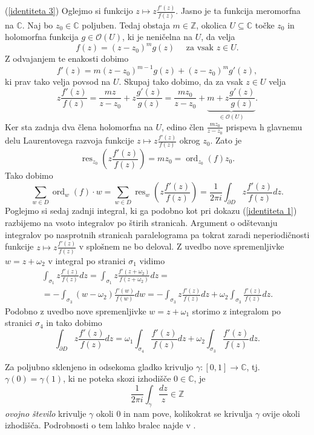 \documentclass[mat1]{fmfdelo}
\numberwithin{equation}{section}
\newcommand{\Z}{\mathbb Z}
\newcommand{\C}{\mathbb C}
\newcommand{\res}[2]{\operatorname{res}_{#1}(#2)}
\newcommand{\ord}[2]{\operatorname{ord}_{#1}(#2)}
\newcommand{\hol}[1]{\mathcal{O}(#1)}
\theoremstyle{definition}
\begin{document}
\begin{dokaz}
    (\ref{identiteta 3}) Oglejmo si funkcijo $z \mapsto z \frac{f'(z)}{f(z)}$. Jasno je ta funkcija meromorfna na $\C$. Naj bo $z_0 \in \C$ poljuben. Tedaj obstaja $m \in \Z$, okolica $U \subseteq \C$ točke $z_0$ in holomorfna funkcija $g \in \hol{U}$, ki je neničelna na $U$, da velja
    \[
        f(z) = (z - z_0)^m g(z) \quad \text{ za vsak $z \in U$.}  
    \]
    Z odvajanjem te enakosti dobimo
    \[
        f'(z) = m(z - z_0)^{m - 1} g(z) + (z - z_0)^m g'(z),
    \]
    ki prav tako velja povsod na $U$. Skupaj tako dobimo, da za vsak $z \in U$ velja
    \[
        z\frac{f'(z)}{f(z)} = \frac{mz}{z-z_0} + z\frac{g'(z)}{g(z)} = \frac{mz_0}{z-z_0} + \underbrace{m + z\frac{g'(z)}{g(z)}}_{\in \hol{U}}.
    \]
    Ker sta zadnja dva člena holomorfna na $U$, edino člen $\frac{mz_0}{z-z_0}$ prispeva h glavnemu delu Laurentovega razvoja funkcije $z \mapsto z \frac{f'(z)}{f(z)}$ okrog $z_0$. Zato je 
    \[
        \operatorname{res}_{z_0} \left( z \frac{f'(z)}{f(z)} \right) = mz_0 = \ord{z_0}{f}z_0.  
    \]
    Tako dobimo 
    \[
        \sum_{w \in D} \ord{w}{f}\cdot w 
        = \sum_{w \in D} \operatorname{res}_{w} \left( z \frac{f'(z)}{f(z)} \right)
        = \frac{1}{2 \pi i} \int_{\partial D} z \frac{f'(z)}{f(z)}dz. 
    \] 
    Poglejmo si sedaj zadnji integral, ki ga podobno kot pri dokazu (\ref{identiteta 1}) razbijemo na vsoto integralov po štirih stranicah. Argument o odštevanju integralov po nasprotnih stranicah paralelograma pa tokrat zaradi neperiodičnosti funkcije $z \mapsto z \frac{f'(z)}{f(z)}$ v splošnem ne bo deloval. Z uvedbo nove spremenljivke $w = z + \omega_2$ v integral po stranici $\sigma_1$ vidimo
    \begin{multline*}
        \int_{\sigma_1} z \frac{f'(z)}{f(z)}dz = 
        \int_{\sigma_1} z \frac{f'(z + \omega_2)}{f(z + \omega_2)}dz = \\ = 
        - \int_{\sigma_3} (w - \omega_2) \frac{f'(w)}{f(w)}dw = 
        - \int_{\sigma_3} z \frac{f'(z)}{f(z)}dz + \omega_2 \int_{\sigma_3} \frac{f'(z)}{f(z)}dz.
    \end{multline*}
    Podobno z uvedbo nove spremenljivke $w = z + \omega_1$ storimo z integralom po stranici $\sigma_4$ in tako dobimo
    \[
        \int_{\partial D} z \frac{f'(z)}{f(z)}dz = \omega_1 \int_{\sigma_4} \frac{f'(z)}{f(z)}dz + \omega_2 \int_{\sigma_3} \frac{f'(z)}{f(z)}dz.
    \]

    Za poljubno sklenjeno in odsekoma gladko krivuljo $\gamma : [0,1] \to \C$, tj. $\gamma(0) = \gamma(1)$, ki ne poteka skozi izhodišče $0\in \C$, je
    \[
        \frac{1}{2 \pi i} \int_\gamma \frac{dz}{z} \in \Z
    \]
    \emph{ovojno število} krivulje $\gamma$ okoli $0$ in nam pove, kolikokrat se krivulja $\gamma$ ovije okoli izhodišča. Podrobnosti o tem lahko bralec najde v \cite[4.2.1.]{Ahlfors}.


\end{dokaz}
\end{document}
